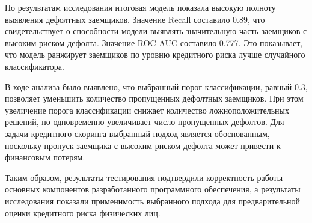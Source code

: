 По результатам исследования итоговая модель показала высокую полноту выявления дефолтных заемщиков. Значение Recall составило 0.89, что свидетельствует о способности модели выявлять значительную часть заемщиков с высоким риском дефолта. Значение ROC-AUC составило 0.777. Это показывает, что модель ранжирует заемщиков по уровню кредитного риска лучше случайного классификатора.

В ходе анализа было выявлено, что выбранный порог классификации, равный 0.3, позволяет уменьшить количество пропущенных дефолтных заемщиков. При этом увеличение порога классификации снижает количество ложноположительных решений, но одновременно увеличивает число пропущенных дефолтов. Для задачи кредитного скоринга выбранный подход является обоснованным, поскольку пропуск заемщика с высоким риском дефолта может привести к финансовым потерям.

Таким образом, результаты тестирования подтвердили корректность работы основных компонентов разработанного программного обеспечения, а результаты исследования показали применимость выбранного подхода для предварительной оценки кредитного риска физических лиц.